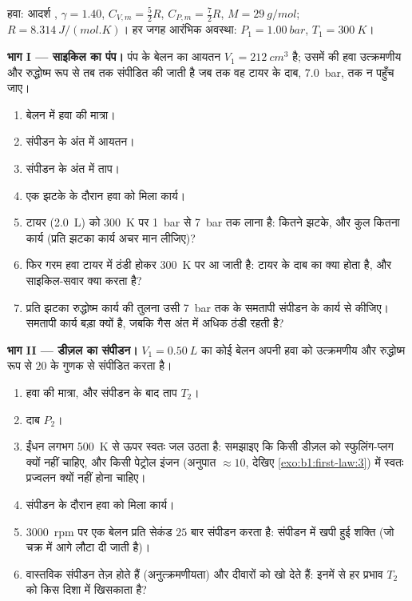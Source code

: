 \begin{problem}
\label{pb:b1:first-law:1}
हवा: आदर्श , $\gamma = 1.40$, $C_{V,m} = \tfrac52 R$, $C_{P,m} =
\tfrac72 R$, $M = \qty{29}{g/mol}$; $R = \qty{8.314}{J/(mol.K)}$। हर जगह
आरंभिक अवस्था: $P_1 = \qty{1.00}{bar}$, $T_1 = \qty{300}{K}$।

\medskip
\noindent\textbf{भाग I --- साइकिल का पंप।}
पंप के बेलन का आयतन $V_1 = \qty{212}{cm^3}$ है; उसमें की हवा उत्क्रमणीय और
रुद्धोष्म रूप से तब तक संपीडित की जाती है जब तक वह टायर के दाब,
\qty{7.0}{bar}, तक न पहुँच जाए।
\begin{enumerate}
  \item बेलन में हवा की मात्रा।
  \item संपीडन के अंत में आयतन।
  \item संपीडन के अंत में ताप।
  \item एक झटके के दौरान हवा को मिला कार्य।
  \item टायर (\qty{2.0}{L}) को \qty{300}{K} पर \qty{1}{bar} से \qty{7}{bar}
        तक लाना है: कितने झटके, और कुल कितना कार्य (प्रति झटका कार्य अचर
        मान लीजिए)?
  \item फिर गरम हवा टायर में ठंडी होकर \qty{300}{K} पर आ जाती है: टायर के
        दाब का क्या होता है, और साइकिल-सवार क्या करता है?
  \item प्रति झटका रुद्धोष्म कार्य की तुलना उसी \qty{7}{bar} तक के समतापी
        संपीडन के कार्य से कीजिए। समतापी कार्य बड़ा क्यों है, जबकि गैस अंत
        में अधिक ठंडी रहती है?
\end{enumerate}

\medskip
\noindent\textbf{भाग II --- डीज़ल का संपीडन।}
$V_1 = \qty{0.50}{L}$ का कोई बेलन अपनी हवा को उत्क्रमणीय और रुद्धोष्म रूप
से $20$ के गुणक से संपीडित करता है।
\begin{enumerate}[resume]
  \item हवा की मात्रा, और संपीडन के बाद ताप $T_2$।
  \item दाब $P_2$।
  \item ईंधन लगभग \qty{500}{K} से ऊपर स्वतः जल उठता है: समझाइए कि किसी
        डीज़ल को स्फुलिंग-प्लग क्यों नहीं चाहिए, और किसी पेट्रोल इंजन
        (अनुपात $\approx 10$, देखिए \cref{exo:b1:first-law:3}) में स्वतः
        प्रज्वलन क्यों नहीं होना चाहिए।
  \item संपीडन के दौरान हवा को मिला कार्य।
  \item \qty{3000}{rpm} पर एक बेलन प्रति सेकंड $25$ बार संपीडन करता है:
        संपीडन में खपी हुई शक्ति (जो चक्र में आगे लौटा दी जाती है)।
  \item वास्तविक संपीडन तेज़ होते हैं (अनुत्क्रमणीयता) और दीवारों को
         खो देते हैं: इनमें से हर प्रभाव $T_2$ को किस दिशा में
        खिसकाता है?
\end{enumerate}


\end{problem}

